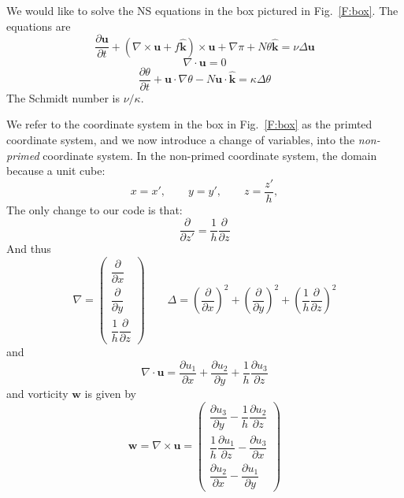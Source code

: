 \documentclass[12pt]{article}
\newcommand{\khat}{\hat{\mathbf k}}
\newcommand{\uv}{\mathbf u}
\newcommand{\omegav}{\mathbf w}
\newcommand{\grad}{\nabla}
\newcommand{\curl}{\grad \times}
\begin{document}
We would like to solve the NS equations in the box pictured in
Fig.~\ref{F:box}.  The equations are
\[
\frac{ \partial  \uv }{\partial t}  + (\curl \uv + f \khat) \times \uv + 
\grad \pi + N \theta \khat = \nu \Delta \uv
\]
\[
\grad \cdot \uv = 0
\]
\[
\frac{ \partial  \theta }{\partial t}  + \uv \cdot \grad \theta - 
N \uv \cdot \khat = \kappa \Delta \theta
\]
The Schmidt number is $\nu / \kappa$.  

We refer to the coordinate system in the box in Fig.~\ref{F:box} as
the primted coordinate system, and we now introduce a 
change of variables, into the {\em non-primed} coordinate
system.  In the non-primed coordinate system, the domain because a 
unit cube:
\[
x = x', \qquad y=y', \qquad  z = \frac{z'}{h},
\]
The only change to our code is that:
\[
\frac{\partial}{\partial z'} = \frac{1}{h} \frac{\partial}{\partial z}
\]
And thus 
\[
\grad = 
\begin{pmatrix} \dfrac{\partial}{\partial x} \\[5mm]
                \dfrac{\partial}{\partial y} \\[5mm]
                \dfrac{1}{h} \dfrac{\partial}{\partial z} 
\end{pmatrix}
 \qquad
\Delta  = \left(\frac{\partial}{\partial x}\right)^2 + 
           \left(\frac{\partial}{\partial y}\right)^2 +
           \left(\frac{1}{h}\frac{\partial}{\partial z}\right)^2 
\]
and
\[
\grad \cdot \uv = \frac{\partial u_1 }{\partial x} + 
\frac{\partial u_2 }{\partial y} + 
\frac{1}{h} \frac{\partial u_3 }{\partial z}
\]
and  vorticity $\omegav$ is given by
\begin{equation}
\label{E:vor}
\omegav = \curl \uv = 
\begin{pmatrix}
\dfrac{\partial u_3}{\partial y} - \dfrac{1}{h} \dfrac{\partial u_2}{\partial z}  \\[5mm]
\dfrac{1}{h} \dfrac{\partial u_1}{\partial z} -  \dfrac{\partial u_3}{\partial x}  \\[5mm]
\dfrac{\partial u_2}{\partial x} - \dfrac{\partial u_1}{\partial y}
\end{pmatrix}  
\end{equation}
\end{document}
